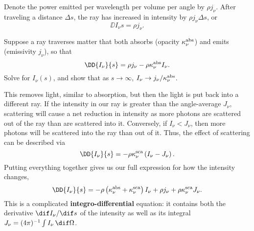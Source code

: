  Denote the power emitted per wavelength per volume per angle by $\rho j_{\nu}$. After traveling a distance $\Delta s$, the ray has increased in intensity by $\rho j_{\nu}\Delta s$, or
\begin{equation}\label{e.emission-microscopic}
\DD{I_{\nu}}{s} = \rho j_{\nu}.
\end{equation}

\begin{exercisebox}
Suppose a ray traverses matter that both absorbs (opacity $\kappa_\nu^{\mathrm{abs}}$) and emits (emissivity $j_{\nu}$), so that
\[	\DD{I_{\nu}}{s} = \rho j_{\nu} - \rho\kapabs I_{\nu}. \]
Solve for $I_{\nu}(s)$, and show that as $s\to\infty$, $I_{\nu}\to j_{\nu}/\kappa_\nu^{\mathrm{abs}}$.
\label{ex.intensity-at-large-depth}
\end{exercisebox}

 This removes light, similar to absorption, but then the light is put back into a different ray. If the intensity in our ray is greater than the angle-average $J_{\nu}$, scattering will cause a net reduction in intensity as more photons are scattered out of the ray than are scattered into it. Conversely, if $I_{\nu} < J_{\nu}$, then more photons will be scattered into the ray than out of it. Thus, the effect of scattering can be described via
\begin{equation}\label{e.scattering-microscopic}
\DD{I_{\nu}}{s} = -\rho\kapscat \left(I_{\nu} - J_{\nu}\right).
\end{equation}
Putting everything together gives us our full expression for how the intensity changes,
\begin{equation}\label{e.transfer-equation}
\DD{I_{\nu}}{s} = -\rho\left(\kapabs + \kapscat\right) I_{\nu} + \rho j_{\nu} + \rho\kapscat J_{\nu}.
\end{equation}
This is a complicated \textbf{integro-differential} equation: it contains both the derivative $\dif I_{\nu}/\dif s$ of the intensity as well as its integral $J_{\nu} = (4\pi)^{-1}\int I_{\nu}\,\dif\Omega$.

